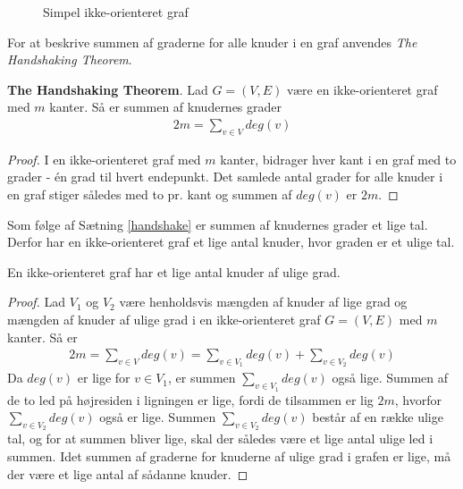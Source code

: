 \begin{figure}[h]
\centering
{}
\caption{Simpel ikke-orienteret graf} \label{eksempel_nabo}
\end{figure}

\noindent For at beskrive summen af graderne for alle knuder i en graf anvendes \textit{The Handshaking Theorem}. 

\begin{thm}\label{handshake}
\textbf{The Handshaking Theorem}. Lad $G=(V,E)$ være en ikke-orienteret graf med $m$ kanter. Så er summen af knudernes grader \\
\begin{align*}
2m=\sum_{v \in V}deg(v)
\end{align*}
\end{thm}

\begin{proof}
I en ikke-orienteret graf med $m$ kanter, bidrager hver kant i en graf med to grader - én grad til hvert endepunkt. Det samlede antal grader for alle knuder i en graf stiger således med to pr. kant og summen af $deg(v)$ er $2m$. 
\end{proof}

\noindent Som følge af Sætning \ref{handshake} er summen af knudernes grader et lige tal. Derfor har en ikke-orienteret graf et lige antal knuder, hvor graden er et ulige tal.

\begin{thm}
En ikke-orienteret graf har et lige antal knuder af ulige grad. 
\end{thm}

\begin{proof}
Lad $V_1$ og $V_2$ være henholdsvis mængden af knuder af lige grad og mængden af knuder af ulige grad i en ikke-orienteret graf $G=(V,E)$ med $m$ kanter. Så er \\
\begin{align*}
2m=\sum_{v \in V}deg(v)=\sum_{v \in V_1}deg(v)+ \sum_{v \in V_2}deg(v)
\end{align*}
Da $deg(v)$ er lige for $v \in V_1$, er summen $\sum_{v \in V_1}deg(v)$ også lige. Summen af de to led på højresiden i ligningen er lige, fordi de tilsammen er lig $2m$, hvorfor $\sum_{v \in V_2}deg(v)$ også er lige. Summen $\sum_{v \in V_2}deg(v)$ består af en række ulige tal, og for at summen bliver lige, skal der således være et lige antal ulige led i summen.
Idet summen af graderne for knuderne af ulige grad i grafen er lige, må der være et lige antal af sådanne knuder.
\end{proof}




